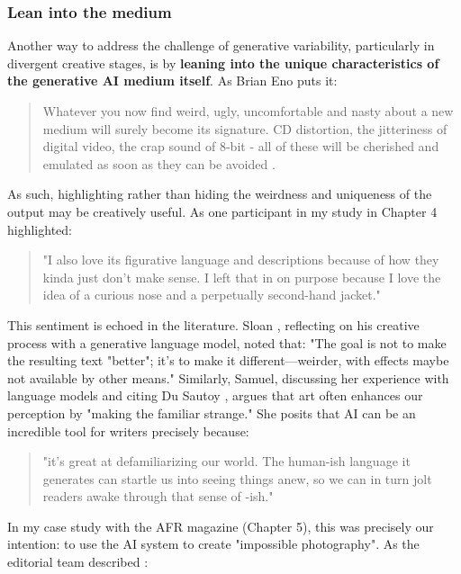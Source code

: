 \subsubsection{Lean into the medium}

Another way to address the challenge of generative variability, particularly in divergent creative stages, is by \textbf{leaning into the unique characteristics of the generative AI medium itself}. As Brian Eno puts it:

\begin{quote}
Whatever you now find weird, ugly, uncomfortable and nasty about a new medium will surely become its signature. CD distortion, the jitteriness of digital video, the crap sound of 8-bit - all of these will be cherished and emulated as soon as they can be avoided \cite{Eno2007-fl}.
\end{quote}

As such, highlighting rather than hiding the weirdness and uniqueness of the output may be creatively useful. As one participant in my study in Chapter 4 highlighted:

\begin{quote}
"I also love its figurative language and descriptions because of how they kinda just don't make sense. I left that in on purpose because I love the idea of a curious nose and a perpetually second-hand jacket."
\end{quote}

This sentiment is echoed in the literature. Sloan \cite{Sloan2016-fj}, reflecting on his creative process with a generative language model, noted that: "The goal is not to make the resulting text "better"; it's to make it different—weirder, with effects maybe not available by other means." Similarly, Samuel, discussing her experience with language models and citing Du Sautoy \cite{Samuel2019-gc}, argues that art often enhances our perception by "making the familiar strange." She posits that AI can be an incredible tool for writers precisely because:

\begin{quote}
"it's great at defamiliarizing our world. The human-ish language it generates can startle us into seeing things anew, so we can in turn jolt readers awake through that sense of -ish."
\end{quote}

In my case study with the AFR magazine (Chapter 5), this was precisely our intention: to use the AI system to create "impossible photography". As the editorial team described \cite{Drummond2023-av}:

